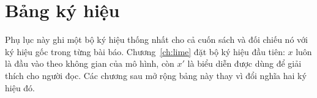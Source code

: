 \chapter{Bảng ký hiệu}
\label{app:ky-hieu}

Phụ lục này ghi một bộ ký hiệu thống nhất cho cả cuốn sách và đối chiếu nó
với ký hiệu gốc trong từng bài báo. Chương~\ref{ch:lime} đặt bộ ký hiệu đầu
tiên: $x$ luôn là đầu vào theo không gian của mô hình, còn $x'$ là biểu diễn
được dùng để giải thích cho người đọc. Các chương sau mở rộng bảng này thay vì
đổi nghĩa hai ký hiệu đó.

